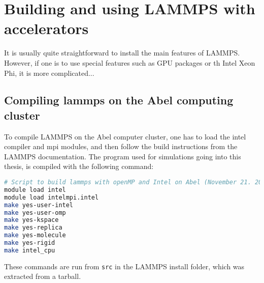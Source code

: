 \chapter{Building and using LAMMPS with accelerators} 
It is usually quite straightforward to install the main features of LAMMPS. However, if one is to use special features such as GPU packages or th Intel Xeon Phi, it is more complicated... 	

\section{Compiling lammps on the Abel computing cluster}
To compile LAMMPS on the Abel computer cluster, one has to load the intel compiler and mpi modules, and then follow the build instructions from the LAMMPS documentation. The program used for simulations going into this thesis, is compiled with the following command:
\begin{lstlisting}[language=Bash]
# Script to build lammps with openMP and Intel on Abel (November 21. 2014)
module load intel
module load intelmpi.intel
make yes-user-intel
make yes-user-omp
make yes-kspace
make yes-replica
make yes-molecule
make yes-rigid
make intel_cpu
\end{lstlisting}
These commands are run from {\tt src} in the LAMMPS install folder, which was extracted from a tarball.


